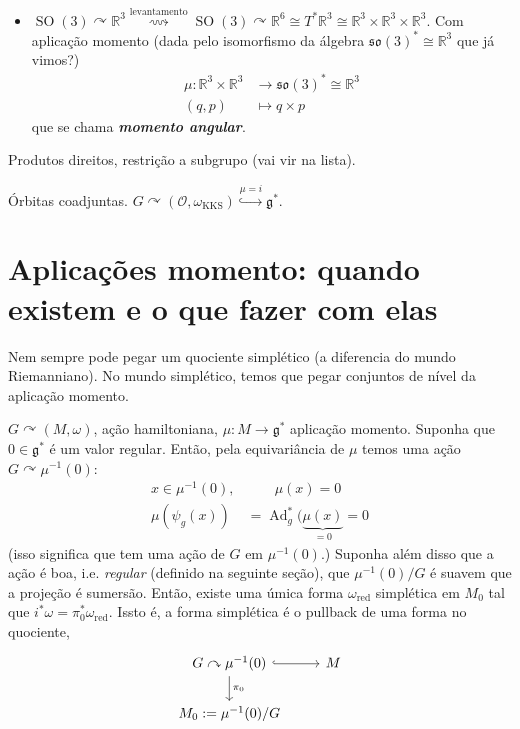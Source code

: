 \begin{example}\leavevmode
	\begin{itemize}
	\item $\operatorname{SO}(3) \curvearrowright \mathbb{R}^3\overset{\text{levantamento} }{\rightsquigarrow }\operatorname{SO}(3) \curvearrowright \mathbb{R}^{6}\cong T^*\mathbb{R}^{3}\cong \mathbb{R}^{3}\times \mathbb{R}^{3}\times \mathbb{R}^{3}$. Com aplicação momento (dada pelo isomorfismo da álgebra $\mathfrak{so}(3)^*\cong \mathbb{R}^{3}$ que já vimos?)
		\begin{align*}
			\mu: \mathbb{R}^{3}\times \mathbb{R}^{3} &\longrightarrow \mathfrak{so}(3)^*\cong \mathbb{R}^{3} \\
			(q,p) &\longmapsto q\times p
		\end{align*}
		que se chama \textit{\textbf{momento angular}}.
	\end{itemize}

	\item Produtos direitos, restrição a subgrupo (vai vir na lista).

	\item \'Orbitas coadjuntas. $G \curvearrowright(\mathcal{O},\omega_{\operatorname{KKS}})\overset{\mu=i}{\hookrightarrow }\mathfrak{g}^*$.
\end{example}

\section{Aplicações momento: quando existem e o que fazer com elas}

Nem sempre pode pegar um quociente simplético (a diferencia do mundo Riemanniano). No mundo simplético, temos que pegar conjuntos de nível da aplicação momento.

\begin{thm}\leavevmode
	$G\curvearrowright(M,\omega)$, ação hamiltoniana, $\mu:M\to \mathfrak{g}^*$ aplicação momento. Suponha que $0\in\mathfrak{g}^*$ é um valor regular. Então, pela equivariância de $\mu$ temos uma ação $G \curvearrowright \mu^{-1}(0)$:
	\begin{align*}
		x\in\mu^{-1}(0),&\qquad \mu(x)=0\\
		\mu(\psi_g(x))& =\operatorname{Ad}^* _g(\underbrace{\mu(x)}_{=0}=0
	\end{align*}
	(isso significa que tem uma ação de $G$ em $\mu^{-1}(0)$.) Suponha além disso que a ação é boa, i.e. \textit{regular} (definido na seguinte seção), que $\mu^{-1}(0)/G$ é suavem que a projeção  é sumersão. Então, existe uma úmica forma $\omega_{\operatorname{red}}$ simplética em $M_0$ tal que  $i^*\omega=\pi_0^*\omega_{\operatorname{red}}$. Issto é, a forma simplética é o pullback de uma forma no quociente,
	\[\begin{tikzcd}
		G\curvearrowright \mu^{-1}(0)\arrow[r,hook]\arrow[d,"\pi_0"]&M\\
M_0:=\mu^{-1}(0)/G
	\end{tikzcd}\]
\end{thm}

